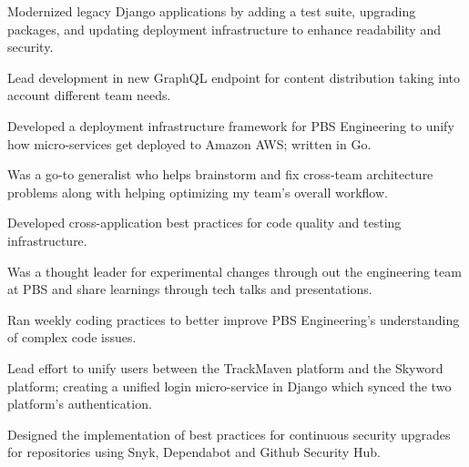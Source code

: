 \documentclass{bluefin_cv}
\begin{document}
\begin{bfcvlist}
    \item Modernized legacy Django applications by adding a test suite, upgrading packages, and updating deployment infrastructure to enhance readability and security.
    \item Lead development in new GraphQL endpoint for content distribution taking into account different team needs.
    \item Developed a deployment infrastructure framework for PBS Engineering to unify how micro-services get deployed to Amazon AWS; written in Go.
    \item Was a go-to generalist who helps brainstorm and fix cross-team architecture problems along with helping optimizing my team's overall workflow.
    \item Developed cross-application best practices for code quality and testing infrastructure.
    \item Was a thought leader for experimental changes through out the engineering team at PBS and share learnings through tech talks and presentations.
    \item Ran weekly coding practices to better improve PBS Engineering's understanding of complex code issues.
\end{bfcvlist}

\begin{bfcvlist}
    \item Lead effort to unify users between the TrackMaven platform and the Skyword platform; creating a unified login micro-service in Django which synced the two platform's authentication.
    \item Designed the implementation of best practices for continuous security upgrades for repositories using Snyk, Dependabot and Github Security Hub.
\end{bfcvlist}
\end{document}
